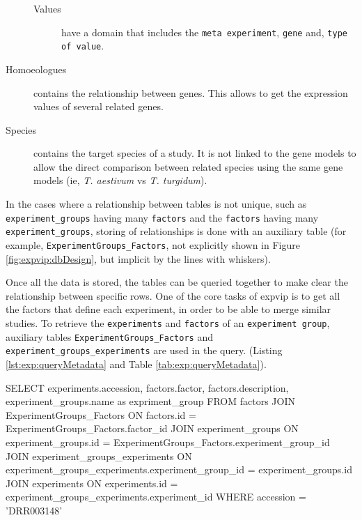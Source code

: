 \begin{description}
\begin{description}
\item[Values] have a domain that includes the \texttt{meta experiment}, \texttt{gene} and, \texttt{type of value}.
\end{description}
\item[Homoeologues] contains the relationship between genes. This allows to get the expression values of several related genes. 
\item[Species] contains the target species of a study. It is not linked to the gene models to allow the direct comparison between related species using the same gene models (ie, \textit{T. aestivum} vs \textit{T. turgidum}). 
\end{description}

In the cases where a relationship between tables is not unique, such as \texttt{experiment\_groups} having many \texttt{factors} and the \texttt{factors} having many \texttt{experiment\_groups}, storing of relationships is done with an auxiliary table (for example, \texttt{ExperimentGroups\_Factors}, not explicitly shown in Figure \ref{fig:expvip:dbDesign}, but implicit by the lines with whiskers). 

Once all the data is stored, the tables can be queried together to make clear the relationship between specific rows. 
One of the core tasks of \gls{expvip} is to get all the factors that define each experiment, in order to be able to merge similar studies. 
To retrieve the \texttt{experiments} and \texttt{factors} of an \texttt{experiment group}, auxiliary tables \texttt{ExperimentGroups\_Factors}  and \texttt{experiment\_groups\_experiments} are used in the query. (Listing \ref{lst:exp:queryMetadata} and Table \ref{tab:exp:queryMetadata}).


\begin{code}[language=sql, caption={[Query experiments and factors]Query experiments and factorsQuery experiments and factors from accession 'DRR003148'},label=lst:exp:queryMetadata]
SELECT
	experiments.accession,  
	factors.factor,
	factors.description, 
	experiment_groups.name as expriment_group 
FROM factors 
JOIN ExperimentGroups_Factors 
	ON factors.id = ExperimentGroups_Factors.factor_id
JOIN experiment_groups 
	ON experiment_groups.id = ExperimentGroups_Factors.experiment_group_id
JOIN experiment_groups_experiments 
	ON experiment_groups_experiments.experiment_group_id = experiment_groups.id
JOIN experiments 
	ON experiments.id = experiment_groups_experiments.experiment_id
WHERE accession =  'DRR003148'
\end{code}

